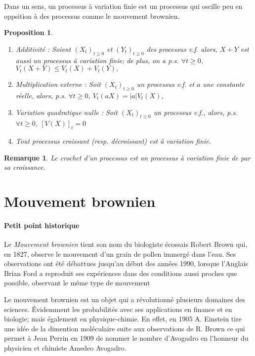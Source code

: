 \documentclass[openany]{book}
\newcommand{\1}{\mathbbm{1}}
\theoremstyle{thmfont}
\theoremstyle{deffont}
\theoremstyle{thmfont}
\newtheorem{prop}[prop]{Proposition}
\theoremstyle{deffont}
\newtheorem{remark}[remark]{Remarque}
\begin{document}
Dans un sens, un processus à variation finie est un processus qui oscille peu en oppsition à des processus comme le mouvement brownien. 

\begin{prop}
  \begin{enumerate}[nosep]
  \item Additivité : Soient $(X_t)_{t\geq0}$ et $(Y_t)_{t\geq0}$ des processus v.f. alors, $X+Y$ est aussi un processus à variation finie; de plus, on a p.s. $\forall t \geq 0$, $V_t(X+Y) \leq V_t(X)+V_t(Y),$
  \item Multiplication externe : Soit $(X_t)_{t\geq0}$ un processus v.f. et $a$ une constante réelle, alors, p.s. $\forall t\geq0$, $V_t(aX) = |a| V_t(X)$,
  \item Variation quadratique nulle : Soit $(X_t)_{t\geq0}$ un processus v.f., alors, p.s. $\forall t \geq 0$, $[V(X)]_t=0$
  \item Tout processus croissant (resp. décroissant) est à variation finie.
  \end{enumerate}
\end{prop}

\begin{remark}
  Le crochet d'un processus est un processus à variation finie de par sa croissance.
\end{remark}

\section{Mouvement brownien}
\paragraph{Petit point historique}
Le \textit{Mouvement brownien} tient son nom du biologiste écossais Robert Brown qui, en 1827, observe le mouvement d'un grain de pollen immergé dans l'eau. Ses observations ont été débattues jusqu’au début des années 1990, lorsque l’Anglais Brian Ford a reproduit ses expériences dans des conditions aussi proches que possible, observant le même type de mouvement


Le mouvement brownien est un objet qui a révolutionné plusieurs domaines des sciences. Évidemment les probabilités avec ses applications en finance et en biologie; mais également en physique-chimie. En effet, en 1905 A. Einstein tire une idée de la dimention moléculaire suite aux observations de R. Brown ce qui permet à Jean Perrin en 1909 de nommer le nombre d'Avogadro en l'honneur du physicien et chimiste Amedeo Avogadro.
\end{document}
